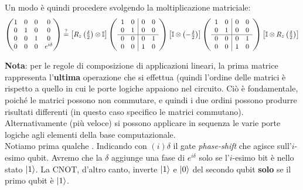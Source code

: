 \documentclass[../../InformazioneQuantistica.tex]{subfiles}
\begin{document}
Un modo è quindi procedere svolgendo la moltiplicazione matriciale: 
\begin{align*}
\begin{pmatrix} 1 & 0 & 0 & 0\\
0 & 1 & 0 & 0\\
0 & 0 & 1 & 0\\
0 & 0 & 0 & e^{i\delta}
\end{pmatrix} \overset{?}{=}
\begin{bmatrix} R_z\left(\frac{\delta}{2}\right) \otimes \mathbb{I}\end{bmatrix}
\left(
        \begin{array}{cc|cc}
        1 & 0 & 0 & 0 \\
        0 & 1 & 0 & 0 \\
        \hline
        0 & 0 & 0 & 1 \\
        0 & 0 & 1 & 0 \\        
        \end{array}
\right)
 \begin{bmatrix} \mathbb{I}\otimes \left(-\frac{\delta}{2}\right)\end{bmatrix}
\left(
        \begin{array}{cc|cc}
        1 & 0 & 0 & 0 \\
        0 & 1 & 0 & 0 \\
        \hline
        0 & 0 & 0 & 1 \\
        0 & 0 & 1 & 0 \\        
        \end{array}
\right)
\begin{bmatrix}
\mathbb{I}\otimes R_z\left(\frac{\delta}{2}\right) \end{bmatrix}
\end{align*}

\textbf{Nota}: per le regole di composizione di applicazioni lineari, la prima matrice rappresenta l'\textbf{ultima} operazione che si effettua (quindi l'ordine delle matrici è  rispetto a quello in cui le porte logiche appaiono nel circuito. Ciò è fondamentale, poiché le matrici possono non commutare, e quindi i due ordini possono produrre risultati differenti (in questo caso specifico le matrici commutano).\\

Alternativamente (più veloce) si possono applicare in sequenza le varie porte logiche agli elementi della base computazionale.\\
Notiamo prima qualche . Indicando con $(i)\delta$ il gate \textit{phase-shift} che agisce sull'$i$-esimo qubit. Avremo che la $\delta$ aggiunge una fase di $e^{i\delta}$ solo se l'$i$-esimo bit è nello stato $\Ket{1}$. La CNOT, d'altro canto, inverte $\Ket{1}$ e $\Ket{0}$ del secondo qubit \textbf{solo} se il primo qubit è $\Ket{1}$.\\
\end{document}

